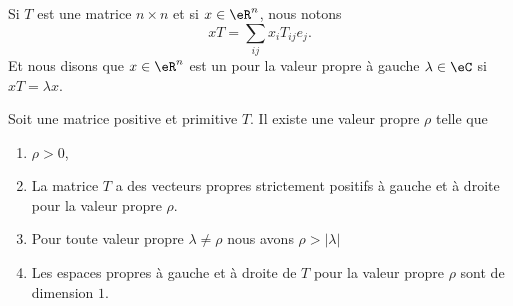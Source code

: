 \begin{definition}      \label{DEFooRFQCooQrLPVw}
	Si \( T\) est une matrice \( n\times n\) et si \( x\in \eR^n\), nous notons
	\begin{equation}
		xT=\sum_{ij}x_iT_{ij}e_j.
	\end{equation}
	Et nous disons que \( x\in \eR^n\) est un  pour la valeur propre à gauche \( \lambda\in \eC\) si \( xT=\lambda x\).
\end{definition}

\begin{theorem}       \label{THOooRSPJooMCFeeP}
	Soit une matrice positive et primitive \( T\). Il existe une valeur propre \( \rho\) telle que
	\begin{enumerate}
		\item
		      \( \rho>0\),
		\item
		      La matrice \( T\) a des vecteurs propres strictement positifs à gauche et à droite pour la valeur propre \( \rho\).
		\item
		      Pour toute valeur propre \( \lambda\neq \rho\) nous avons \( \rho>| \lambda |\)
		\item
		      Les espaces propres à gauche et à droite de \( T\) pour la valeur propre \( \rho\) sont de dimension \( 1\).
	\end{enumerate}
\end{theorem}


